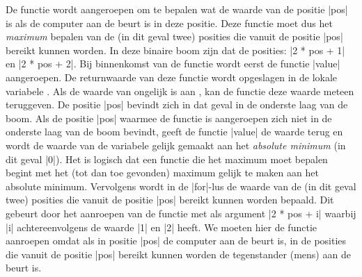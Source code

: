 \begin{cpplstShortInline}
De functie  wordt aangeroepen om te bepalen wat de waarde van de positie |pos| is als de computer aan de beurt is in deze positie.
Deze functie moet dus het \emph{maximum} bepalen van de (in dit geval twee) posities die vanuit de positie |pos| bereikt kunnen worden.
In deze binaire boom zijn dat de posities: |2 * pos + 1| en |2 * pos + 2|.
Bij binnenkomst van de functie  wordt eerst de functie |value| aangeroepen.
De returnwaarde van deze functie wordt opgeslagen in de lokale variabele .
Als de waarde van  ongelijk is aan , kan de functie  deze waarde meteen teruggeven.
De positie |pos| bevindt zich in dat geval in de onderste laag van de boom.
Als de positie |pos| waarmee de functie  is aangeroepen zich niet in de onderste laag van de boom bevindt, geeft de functie |value| de waarde  terug en wordt de waarde van de variabele  gelijk gemaakt aan het \emph{absolute minimum} (in dit geval |0|).
Het is logisch dat een functie die het maximum moet bepalen begint met het (tot dan toe gevonden) maximum gelijk te maken aan het absolute minimum.
Vervolgens wordt in de |for|\hyp{}lus de waarde van de (in dit geval twee) posities die vanuit de positie |pos| bereikt kunnen worden bepaald.
Dit gebeurt door het aanroepen van de functie  met als argument |2 * pos + i| waarbij |i| achtereenvolgens de waarde |1| en |2| heeft.
We moeten hier de functie  aanroepen omdat als in positie |pos| de computer aan de beurt is, in de posities die vanuit de positie |pos| bereikt kunnen worden de tegenstander (mens) aan de beurt is.

\end{cpplstShortInline}
